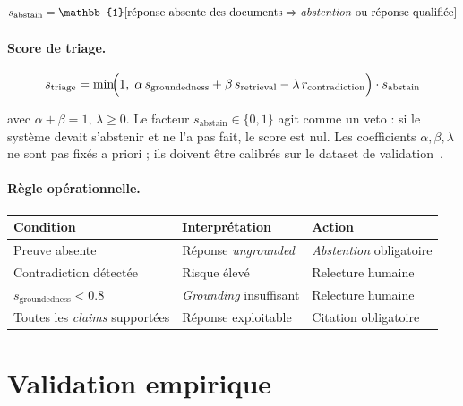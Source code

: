 \begin{equation}
  s_{\text{abstain}}
  = \mathbb{1}[
    \text{réponse absente des documents}
    \Rightarrow
    \text{\textit{abstention} ou réponse qualifiée}
  ]
  \label{eq:llm_abstain}
\end{equation}

\paragraph{Score de triage.}

\begin{equation}
  s_{\text{triage}}
  = \min\!\Bigl(1,\;
    \alpha\, s_{\text{groundedness}}
    + \beta\, s_{\text{retrieval}}
    - \lambda\, r_{\text{contradiction}}
  \Bigr) \cdot s_{\text{abstain}}
  \label{eq:llm_triage}
\end{equation}

avec $\alpha + \beta = 1$, $\lambda \geq 0$.
Le facteur $s_{\text{abstain}} \in \{0, 1\}$ agit comme un veto :
si le système devait s'abstenir et ne l'a pas fait, le score est nul.
Les coefficients $\alpha, \beta, \lambda$ ne sont pas fixés a priori ;
ils doivent être calibrés sur le dataset de validation~\cite{guo2017calibration}.

\paragraph{Règle opérationnelle.}

\begin{center}
\begin{tabular}{lll}
\toprule
\textbf{Condition} & \textbf{Interprétation} & \textbf{Action} \\
\midrule
Preuve absente                        & Réponse \textit{ungrounded}  & \textit{Abstention} obligatoire \\
Contradiction détectée                & Risque élevé                 & Relecture humaine \\
$s_{\text{groundedness}} < 0.8$       & \textit{Grounding} insuffisant & Relecture humaine \\
Toutes les \textit{claims} supportées & Réponse exploitable          & Citation obligatoire \\
\bottomrule
\end{tabular}
\end{center}

\section{Validation empirique}

